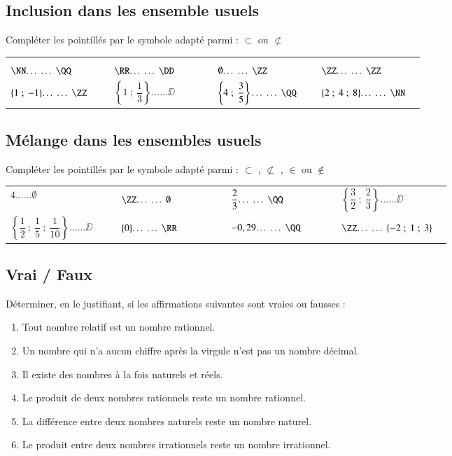 \documentclass[oneside,12pt]{article}          %
\begin{document}
\subsection{Inclusion dans les ensemble usuels}
Compléter les pointillés par le symbole adapté parmi : $\subset$ ou $\not\subset$

\renewcommand{\arraystretch}{1.75}
\begin{tabular}{P{0.23\linewidth} P{0.23\linewidth} P{0.23\linewidth} P{0.23\linewidth}}
	$\NN \ldots\ldots \QQ$ & $\RR \ldots\ldots \DD$ & $\emptyset \ldots\ldots \ZZ$ & $\ZZ \ldots\ldots \ZZ$ \\
	$\{1 ~;~ -1\} \ldots\ldots \ZZ$ & $\left\{1 ~;~ \dfrac{1}{3}\right\} \ldots\ldots \DD$ & $\left\{4 ~;~ \dfrac{3}{5}\right\} \ldots\ldots \QQ$ & $\{2 ~;~ 4 ~;~ 8\} \ldots\ldots \NN$
\end{tabular}



\subsection{Mélange dans les ensembles usuels}
Compléter les pointillés par le symbole adapté parmi : $\subset$ , $\not\subset$ , $\in$ ou $\notin$

\renewcommand{\arraystretch}{1.75}
\begin{tabular}{P{0.23\linewidth} P{0.23\linewidth} P{0.23\linewidth} P{0.23\linewidth}}
	$4 \ldots\ldots \emptyset$ &
	$\ZZ \ldots\ldots \emptyset$ &
	$\dfrac{2}{3} \ldots\ldots \QQ$ &
	$\left\{ \dfrac{3}{2}  ~;~  \dfrac{2}{3} \right\} \ldots\ldots \DD$ \\
	$\left\{ \dfrac{1}{2}  ~;~  \dfrac{1}{5}  ~;~  \dfrac{1}{10} \right\} \ldots\ldots \DD$ &
	$\{0\} \ldots\ldots \RR$ &
	$-0,29 \ldots\ldots \QQ$ &
	$\ZZ \ldots\ldots \{-2 ~;~ 1 ~;~ 3\}$
\end{tabular}



\subsection{Vrai / Faux}
Déterminer, en le justifiant, si les affirmations suivantes sont vraies ou fausses :
\begin{enumerate}
	\item Tout nombre relatif est un nombre rationnel.
	\item Un nombre qui n'a aucun chiffre après la virgule n'est pas un nombre décimal.
	\item Il existe des nombres à la fois naturels et réels.
	\item Le produit de deux nombres rationnels reste un nombre rationnel.
	\item La différence entre deux nombres naturels reste un nombre naturel.
	\item Le produit entre deux nombres irrationnels reste un nombre irrationnel.
\end{enumerate}
\end{document}
